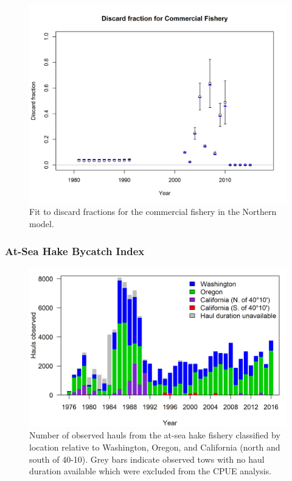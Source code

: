 \documentclass[12pt,]{article}
\begin{document}
\FloatBarrier

\newpage

\begin{figure}[htbp]
\centering
\includegraphics{r4ss/plots_mod1/discard_dataCommercial Fishery.png}
\caption{Fit to discard fractions for the commercial fishery in the
Northern model.\label{fig:r4ss_discard_fits}}
\end{figure}

\FloatBarrier

\newpage

\subsubsection{At-Sea Hake Bycatch
Index}\label{at-sea-hake-bycatch-index}

\begin{figure}[htbp]
\centering
\includegraphics{Figures/ASHOP_hauls_observed_by_state.png}
\caption{Number of observed hauls from the at-sea hake fishery
classified by location relative to Washington, Oregon, and California
(north and south of 40-10). Grey bars indicate observed tows with no
haul duration available which were excluded from the CPUE
analysis.\label{fig:ASHOP_X1}}
\end{figure}
\end{document}

